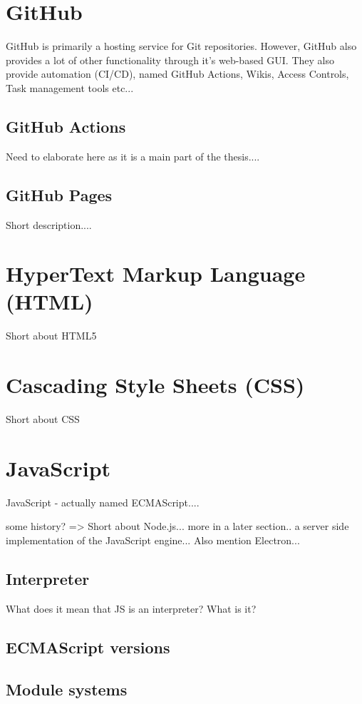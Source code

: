 \section{GitHub}
GitHub is primarily a hosting service for Git repositories. However, GitHub also provides a lot of other functionality through it's web-based GUI. They also provide automation (CI/CD), named GitHub Actions, Wikis, Access Controls, Task management tools etc...
\subsection{GitHub Actions}
Need to elaborate here as it is a main part of the thesis....

\subsection{GitHub Pages}
Short description....

\section{HyperText Markup Language (HTML)}
Short about HTML5

\section{Cascading Style Sheets (CSS)}
Short about CSS

\section{JavaScript}
JavaScript - actually named ECMAScript....


some history? =>
Short about Node.js... more in a later section.. a server side implementation of the JavaScript engine... 
Also mention Electron...

\subsection{Interpreter}
What does it mean that JS is an interpreter? What is it?

\subsection{ECMAScript versions}

\subsection{Module systems}
